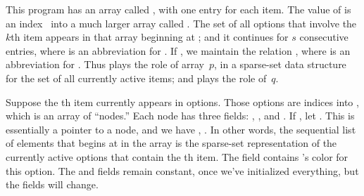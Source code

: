 This program has an
array called , with one entry for each item. The value of 
is an index~ into a much larger array called . The set of
all
options that involve the $k$th item appears in that array beginning
at ; and it continues for $s$ consecutive entries, where 
is an abbreviation for . If ,
we maintain the
relation , where  is an abbreviation
for
. Thus  plays the role of array~$p$, in a
sparse-set data structure for the set of all currently active items;
and  plays the role of~$q$.

Suppose the th item  currently appears in  options.
Those options
are indices into , which is an array of ``nodes.'' Each node
has three fields: , , and . If , let .
This is essentially a pointer to a node, and we have
, . In other
words,
the sequential list of  elements that begins at
 in the  array is the sparse-set
representation of the
currently active options that contain the th item.
The  field  contains 's color for
this option.
The  and  fields remain constant,
once we've initialized everything, but the  fields will change.

